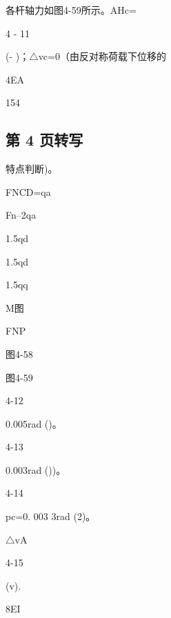 各杆轴力如图4-59所示。AHc=

4 - 11

(- )；$\triangle$vc=0（由反对称荷载下位移的

4EA

154

\subsection*{第 4 页转写}
特点判断)。

FNCD=qa

Fn--2qa

1.5qd

1.5qd

1.5qq

M图

FNP

图4-58

图4-59

4-12

0.005rad ()。

4-13

0.003rad ())。

4-14

pc=0. 003 3rad (2)。

$\triangle$vA

4-15

(v).

8EI

